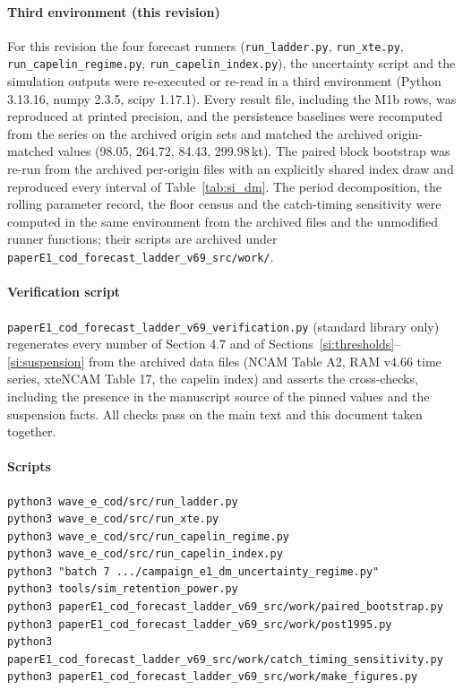 \paragraph{Third environment (this revision)} For this revision the four forecast runners (\texttt{run\_ladder.py}, \texttt{run\_xte.py}, \texttt{run\_capelin\_regime.py}, \texttt{run\_capelin\_index.py}), the uncertainty script and the simulation outputs were re-executed or re-read in a third environment (Python 3.13.16, numpy 2.3.5, scipy 1.17.1). Every result file, including the M1b rows, was reproduced at printed precision, and the persistence baselines were recomputed from the series on the archived origin sets and matched the archived origin-matched values (98.05, 264.72, 84.43, 299.98\,kt). The paired block bootstrap was re-run from the archived per-origin files with an explicitly shared index draw and reproduced every interval of Table~\ref{tab:si_dm}. The period decomposition, the rolling parameter record, the floor census and the catch-timing sensitivity were computed in the same environment from the archived files and the unmodified runner functions; their scripts are archived under \texttt{paperE1\_cod\_forecast\_ladder\_v69\_src/work/}.

\paragraph{Verification script} \texttt{paperE1\_cod\_forecast\_ladder\_v69\_verification.py} (standard library only) regenerates every number of Section 4.7 and of Sections~\ref{si:thresholds}--\ref{si:suspension} from the archived data files (NCAM Table A2, RAM v4.66 time series, xteNCAM Table 17, the capelin index) and asserts the cross-checks, including the presence in the manuscript source of the pinned values and the suspension facts. All checks pass on the main text and this document taken together.

\paragraph{Scripts}
\begin{verbatim}
python3 wave_e_cod/src/run_ladder.py
python3 wave_e_cod/src/run_xte.py
python3 wave_e_cod/src/run_capelin_regime.py
python3 wave_e_cod/src/run_capelin_index.py
python3 "batch 7 .../campaign_e1_dm_uncertainty_regime.py"
python3 tools/sim_retention_power.py
python3 paperE1_cod_forecast_ladder_v69_src/work/paired_bootstrap.py
python3 paperE1_cod_forecast_ladder_v69_src/work/post1995.py
python3 paperE1_cod_forecast_ladder_v69_src/work/catch_timing_sensitivity.py
python3 paperE1_cod_forecast_ladder_v69_src/work/make_figures.py
\end{verbatim}

